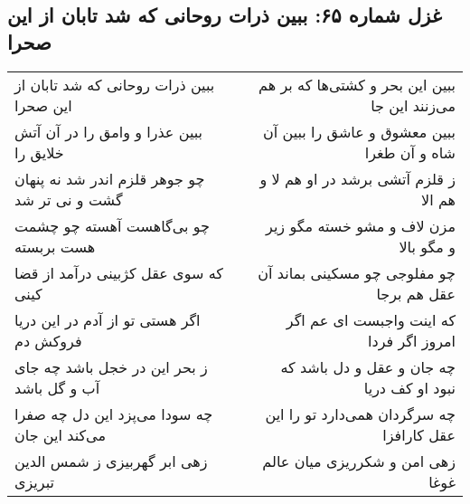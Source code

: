 \begin{center}
\section*{غزل شماره ۶۵: ببین ذرات روحانی که شد تابان از این صحرا}
\label{sec:0065}
\begin{longtable}{l p{0.5cm} r}
ببین ذرات روحانی که شد تابان از این صحرا
&&
ببین این بحر و کشتی‌ها که بر هم می‌زنند این جا
\\
ببین عذرا و وامق را در آن آتش خلایق را
&&
ببین معشوق و عاشق را ببین آن شاه و آن طغرا
\\
چو جوهر قلزم اندر شد نه پنهان گشت و نی تر شد
&&
ز قلزم آتشی برشد در او هم لا و هم الا
\\
چو بی‌گاهست آهسته چو چشمت هست بربسته
&&
مزن لاف و مشو خسته مگو زیر و مگو بالا
\\
که سوی عقل کژبینی درآمد از قضا کینی
&&
چو مفلوجی چو مسکینی بماند آن عقل هم برجا
\\
اگر هستی تو از آدم در این دریا فروکش دم
&&
که اینت واجبست ای عم اگر امروز اگر فردا
\\
ز بحر این در خجل باشد چه جای آب و گل باشد
&&
چه جان و عقل و دل باشد که نبود او کف دریا
\\
چه سودا می‌پزد این دل چه صفرا می‌کند این جان
&&
چه سرگردان همی‌دارد تو را این عقل کارافزا
\\
زهی ابر گهربیزی ز شمس الدین تبریزی
&&
زهی امن و شکرریزی میان عالم غوغا
\\
\end{longtable}
\end{center}
